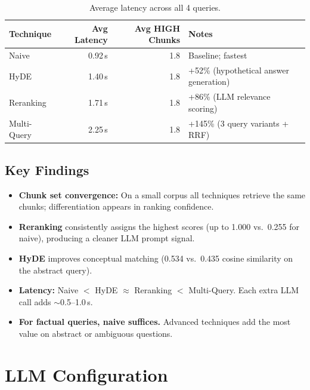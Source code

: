 \documentclass[11pt, letterpaper]{article}
\begin{document}
\begin{table}[H]
\centering\small
\begin{tabularx}{\textwidth}{@{}l r r X@{}}
\toprule
\textbf{Technique} & \textbf{Avg Latency} & \textbf{Avg HIGH Chunks} & \textbf{Notes} \\
\midrule
Naive       & 0.92\,s & 1.8 & Baseline; fastest \\
HyDE        & 1.40\,s & 1.8 & +52\% (hypothetical answer generation) \\
Reranking   & 1.71\,s & 1.8 & +86\% (LLM relevance scoring) \\
Multi-Query & 2.25\,s & 1.8 & +145\% (3 query variants + RRF) \\
\bottomrule
\end{tabularx}
\caption{Average latency across all 4 queries.}
\end{table}

\subsection{Key Findings}

\begin{itemize}
    \item \textbf{Chunk set convergence:} On a small corpus all techniques retrieve
          the same chunks; differentiation appears in ranking confidence.
    \item \textbf{Reranking} consistently assigns the highest scores (up to 1.000
          vs.\ 0.255 for naive), producing a cleaner LLM prompt signal.
    \item \textbf{HyDE} improves conceptual matching (0.534 vs.\ 0.435 cosine
          similarity on the abstract query).
    \item \textbf{Latency:} Naive $<$ HyDE $\approx$ Reranking $<$ Multi-Query.
          Each extra LLM call adds ${\sim}$0.5--1.0\,s.
    \item \textbf{For factual queries, naive suffices.}  Advanced techniques add
          the most value on abstract or ambiguous questions.
\end{itemize}

\section{LLM Configuration}
\end{document}
